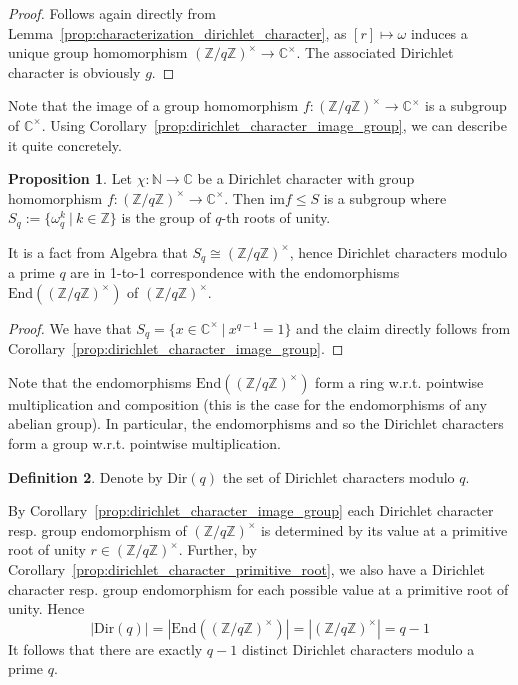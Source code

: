\documentclass{scrartcl}
\newcommand{\N}{\mathbb{N}}
\newcommand{\Z}{\mathbb{Z}}
\newcommand{\C}{\mathbb{C}}
\newcommand{\units}{\times}
\theoremstyle{definition}
\newtheorem{definition}{Definition}
\newtheorem{proposition}[definition]{Proposition}
\begin{document}
\begin{proof}
    Follows again directly from Lemma~\ref{prop:characterization_dirichlet_character}, as $[r] \mapsto \omega$ induces a unique group homomorphism $(\Z/q\Z)^\units \to \C^\units$.
    The associated Dirichlet character is obviously $g$.
\end{proof}
Note that the image of a group homomorphism $f: (\Z/q\Z)^\units \to \C^\units$ is a subgroup of $\C^\units$.
Using Corollary~\ref{prop:dirichlet_character_image_group}, we can describe it quite concretely.
\begin{proposition}
    Let $\chi: \N \to \C$ be a Dirichlet character with group homomorphism $f: (\Z/q\Z)^\units \to \C^\units$.
    Then $\mathrm{im}f \leq S$ is a subgroup where $S_q := \{ \omega_q^k \ | \ k \in \Z \}$ is the group of $q$-th roots of unity.
    
    It is a fact from Algebra that $S_q \cong (\Z/q\Z)^\units$, hence Dirichlet characters modulo a prime $q$ are in 1-to-1 correspondence with the endomorphisms $\mathrm{End}((\Z/q\Z)^\units)$ of $(\Z/q\Z)^\units$.
\end{proposition}
\begin{proof}
    We have that $S_q = \{ x \in \C^\units \ | \ x^{q - 1} = 1 \}$ and the claim directly follows from Corollary~\ref{prop:dirichlet_character_image_group}.
\end{proof}
Note that the endomorphisms $\mathrm{End}((\Z/q\Z)^\units)$ form a ring w.r.t. pointwise multiplication and composition
(this is the case for the endomorphisms of any abelian group).
In particular, the endomorphisms and so the Dirichlet characters form a group w.r.t. pointwise multiplication.
\begin{definition}
    Denote by $\mathrm{Dir}(q)$ the set of Dirichlet characters modulo $q$.
\end{definition}
By Corollary~\ref{prop:dirichlet_character_image_group} each Dirichlet character resp. group endomorphism of $(\Z/q\Z)^\units$ is determined by its value at a primitive root of unity $r \in (\Z/q\Z)^\units$.
Further, by Corollary~\ref{prop:dirichlet_character_primitive_root}, we also have a Dirichlet character resp. group endomorphism for each possible value at a primitive root of unity.
Hence
\begin{equation*}
    |\mathrm{Dir}(q)| = |\mathrm{End}((\Z/q\Z)^\units)| = |(\Z/q\Z)^\units| = q - 1
\end{equation*}
It follows that there are exactly $q - 1$ distinct Dirichlet characters modulo a prime $q$.
\end{document}
